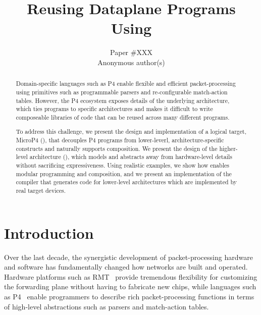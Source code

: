 \documentclass[letterpaper,twocolumn,10pt]{article}
\begin{document}
\date{}
\title{\Large \bf Reusing Dataplane Programs Using \ulang}
\author{{\rm Paper \#XXX}\\ Anonymous author(s)}
\maketitle

\begin{abstract}
Domain-specific languages such as P4 enable flexible and efficient
packet-processing using primitives such as programmable parsers and
re-configurable match-action tables. However, the P4 ecosystem exposes
details of the underlying architecture, which ties programs to
specific architectures and makes it difficult to write composeable
libraries of code that can be reused across many different programs.

To address this challenge, we present the design and implementation of
a logical target, MicroP4 (\uswitch), that decouples P4 programs from
lower-leverl, architecture-specific constructs and naturally supports composition.
We present the design of the higher-level architecture (\uarch),
which models \uswitch and abstracts away from hardware-level details without sacrificing
expressiveness. Using realistic examples, we show how \uswitch enables
modular programming and composition, and we present an implementation
of the \ucomp compiler that generates code for lower-level
architectures which are implemented by real target devices.
\end{abstract}



\section{Introduction}
\label{sec:intro}
Over the last decade, the synergistic development of packet-processing
hardware and software has fundamentally changed how networks are built
and operated. Hardware platforms such as
RMT~\cite{bosshart2013forwarding} provide tremendous flexibility for
customizing the forwarding plane without having to fabricate new
chips, while languages such as P4~\cite{bosshart2014p4, p4lang} enable
programmers to describe rich packet-processing functions in terms of
high-level abstractions such as parsers and match-action tables.
\end{document}
